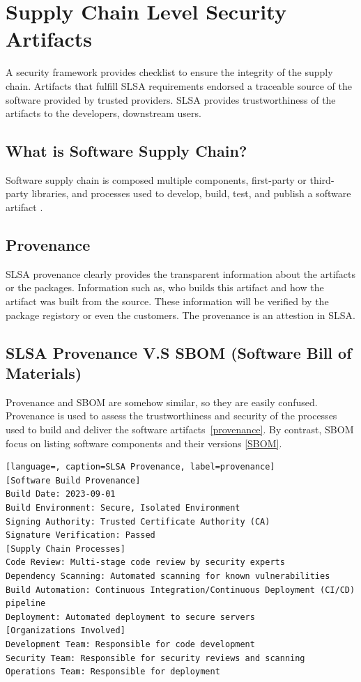\section{Supply Chain Level Security Artifacts~\cite{slsa2023}}
A security framework provides checklist to ensure the integrity of the supply chain.
Artifacts that fulfill SLSA requirements endorsed a traceable source of the software provided
by trusted providers. SLSA provides trustworthiness of the artifacts to the developers, downstream users. 

\subsection{What is Software Supply Chain?}
Software supply chain is composed multiple components, first-party or third-
party libraries, and processes used to develop, build, test, and publish a software 
artifact \cite{DoDDefCI/CD2023}.

\subsection{Provenance}
SLSA provenance clearly provides the transparent information about the artifacts or the packages.
Information such as, who builds this artifact and how the artifact was built from the source.
These information will be verified by the package registory or even the customers. The provenance
is an attestion in SLSA.

\subsection{SLSA Provenance V.S SBOM (Software Bill of Materials)}
Provenance and SBOM are somehow similar, so they are easily confused. Provenance is used to 
assess the trustworthiness and security of the processes used to build and deliver the software artifacts~\ref{provenance}.
By contrast, SBOM focus on listing software components and their versions \ref{SBOM}.

\begin{lstlisting}[language=, caption=SLSA Provenance, label=provenance]
[Software Build Provenance]
Build Date: 2023-09-01
Build Environment: Secure, Isolated Environment
Signing Authority: Trusted Certificate Authority (CA)
Signature Verification: Passed
[Supply Chain Processes]
Code Review: Multi-stage code review by security experts
Dependency Scanning: Automated scanning for known vulnerabilities
Build Automation: Continuous Integration/Continuous Deployment (CI/CD) pipeline
Deployment: Automated deployment to secure servers
[Organizations Involved]
Development Team: Responsible for code development
Security Team: Responsible for security reviews and scanning
Operations Team: Responsible for deployment
\end{lstlisting}


